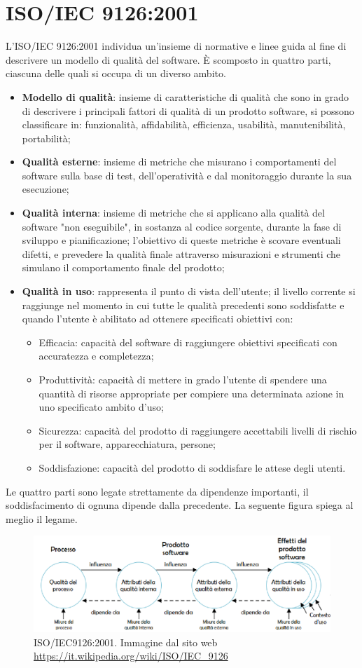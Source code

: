 \section{ISO/IEC 9126:2001}\label{ISO/IEC 9126Section}

L'ISO/IEC 9126:2001 individua un'insieme di normative e linee guida al fine di descrivere un modello di qualità del software. \`E scomposto in quattro parti, ciascuna delle quali si occupa di un diverso ambito. 
\begin{itemize}
	\item \textbf{Modello di qualità}: insieme di caratteristiche di qualità che sono in grado di descrivere i principali fattori di qualità di un prodotto software, si possono classificare in: funzionalità, affidabilità, efficienza, usabilità, manutenibilità, portabilità;
	\item \textbf{Qualità esterne}: insieme di metriche che misurano i comportamenti del software sulla base di test, dell'operatività e dal monitoraggio durante la sua esecuzione;
	\item \textbf{Qualità interna}: insieme di metriche che si applicano alla qualità del software "non eseguibile", in sostanza al codice sorgente, durante la fase di sviluppo e pianificazione; l'obiettivo di queste metriche è scovare eventuali difetti, e prevedere la qualità finale attraverso misurazioni e strumenti che simulano il comportamento finale del prodotto;
	\item \textbf{Qualità in uso}: rappresenta il punto di vista dell'utente; il livello corrente si raggiunge nel momento in cui tutte le qualità precedenti sono soddisfatte e quando l'utente è abilitato ad ottenere specificati obiettivi con:
	\begin{itemize}
		\item Efficacia: capacità del software di raggiungere obiettivi specificati con accuratezza e completezza;
		\item Produttività: capacità di mettere in grado l'utente di spendere una quantità di risorse appropriate per compiere una determinata azione in uno specificato ambito d'uso;
		\item Sicurezza: capacità del prodotto di raggiungere accettabili livelli di rischio per il software, apparecchiatura, persone;
		\item Soddisfazione: capacità del prodotto di soddisfare le attese degli utenti.
	\end{itemize}	
\end{itemize}
Le quattro parti sono legate strettamente da dipendenze importanti, il soddisfacimento di ognuna dipende dalla precedente. La seguente figura spiega al meglio il legame.

\begin{figure}[H]
\centering

	\includegraphics[width=0.9\linewidth]{./images/quality_cicle_iso9126.png} 
	\caption{ISO/IEC9126:2001. Immagine dal sito web \url{https://it.wikipedia.org/wiki/ISO/IEC_9126}}
	\label{ISO/IEC9126:2001}	

\end{figure}

 